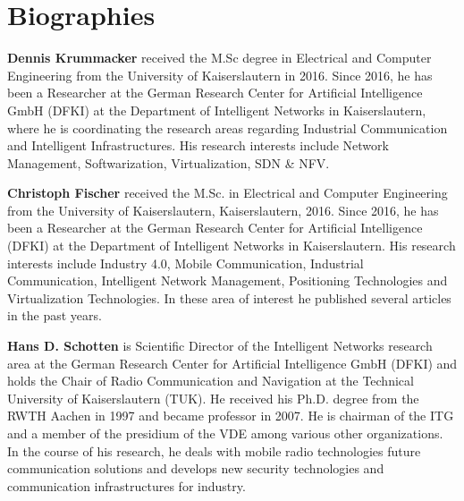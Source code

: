 %
\section*{Biographies}

\textbf{Dennis Krummacker}
received the M.Sc degree in Electrical and Computer Engineering from the University of Kaiserslautern in 2016. 
Since 2016, he has been a Researcher at the German Research Center for Artificial Intelligence GmbH (DFKI) at the Department of Intelligent Networks in Kaiserslautern, where he is coordinating the research areas regarding Industrial Communication and Intelligent Infrastructures.
His research interests include Network Management, Softwarization, Virtualization, SDN \& NFV.


\np%
\textbf{Christoph Fischer}
received the M.Sc. in Electrical and Computer Engineering from the University of Kaiserslautern, Kaiserslautern, 2016.
Since 2016, he has been a Researcher at the German Research Center for Artificial Intelligence (DFKI) at the Department of Intelligent Networks in Kaiserslautern.
His  research  interests  include Industry 4.0, Mobile Communication, Industrial Communication, Intelligent Network Management, Positioning Technologies and Virtualization Technologies.
In these area of interest he published several articles in the past years.


\np%
\textbf{Hans D. Schotten}
is Scientific Director of the Intelligent Networks research area at the German Research Center for Artificial Intelligence GmbH (DFKI) and holds the Chair of Radio Communication and Navigation at the Technical University of Kaiserslautern (TUK).
He received his Ph.D. degree from the RWTH Aachen in 1997 and became professor in 2007.
He is chairman of the ITG and a member of the presidium of the VDE among various other organizations.
In the course of his research, he deals with mobile radio technologies future communication solutions and develops new security technologies and communication infrastructures for industry.